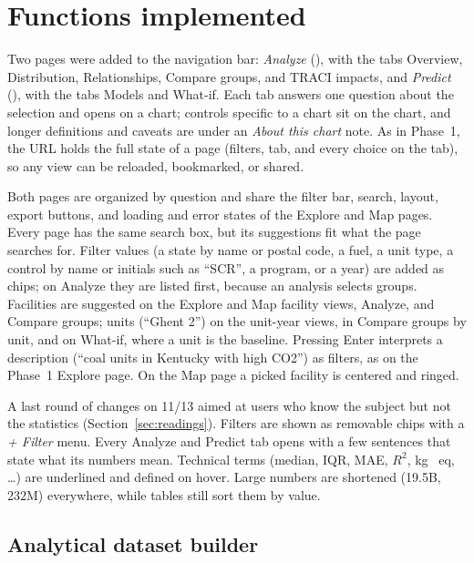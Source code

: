 \documentclass[11pt,a4paper]{article}
\begin{document}
\section{Functions implemented}
\label{sec:functions}

Two pages were added to the navigation bar: \emph{Analyze} (), with the tabs
Overview, Distribution, Relationships, Compare groups, and TRACI impacts, and \emph{Predict}
(), with the tabs Models and What-if. Each tab answers one question about the
selection and opens on a chart; controls specific to a chart sit on the chart, and longer
definitions and caveats are under an \emph{About this chart} note. As in Phase~1, the URL holds
the full state of a page (filters, tab, and every choice on the tab), so any view can be
reloaded, bookmarked, or shared.

Both pages are organized by question and share the filter bar, search, layout, export buttons,
and loading and error states of the Explore and Map pages. Every page has the same search box, but its
suggestions fit what the page searches for. Filter values (a state by name or postal code, a
fuel, a unit type, a control by name or initials such as ``SCR'', a program, or a year) are
added as chips; on Analyze they are listed first, because an analysis selects groups.
Facilities are suggested on the Explore and Map facility views, Analyze, and Compare groups; units
(``Ghent 2'') on the unit-year views, in Compare groups by unit, and on What-if, where a unit is the
baseline. Pressing Enter interprets a description (``coal units in Kentucky with high CO2'') as
filters, as on the Phase~1 Explore page. On the Map page a picked facility is centered and ringed.

A last round of changes on 11/13 aimed at users who know the subject but not the statistics
(Section~\ref{sec:readings}). Filters are shown as removable chips with a \emph{+ Filter} menu.
Every Analyze and Predict tab opens with a few sentences that state what its numbers mean.
Technical terms (median, IQR, MAE, $R^2$, kg \SOtwo{}~eq, \ldots) are underlined and defined on
hover. Large numbers are shortened (19.5B, 232M) everywhere, while tables still sort them by
value.

\subsection{Analytical dataset builder}
\end{document}
